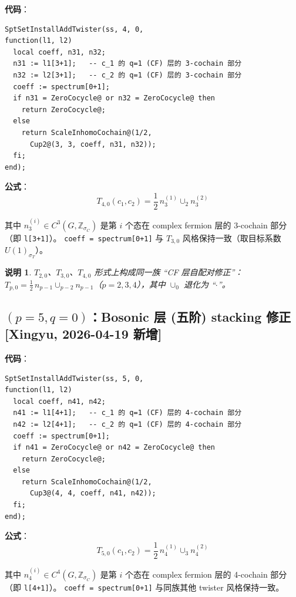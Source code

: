 \documentclass[a4paper,fontset=ubuntu,12pt]{ctexart}
\newtheorem{remark}[definition]{说明}
\newcommand{\ZZ}{\mathbb{Z}}
\newcommand{\aT}{\sigma_T}
\newcommand{\aC}{\sigma_C}
\begin{document}
\textbf{代码}：
\begin{lstlisting}
SptSetInstallAddTwister(ss, 4, 0,
function(l1, l2)
  local coeff, n31, n32;
  n31 := l1[3+1];   -- c_1 的 q=1 (CF) 层的 3-cochain 部分
  n32 := l2[3+1];   -- c_2 的 q=1 (CF) 层的 3-cochain 部分
  coeff := spectrum[0+1];
  if n31 = ZeroCocycle@ or n32 = ZeroCocycle@ then
    return ZeroCocycle@;
  else
    return ScaleInhomoCochain@(1/2,
      Cup2@(3, 3, coeff, n31, n32));
  fi;
end);
\end{lstlisting}

\textbf{公式}：
\begin{equation}
\label{eq:twister-40}
\boxed{T_{4,0}(c_1, c_2) = \frac{1}{2}\, n_3^{(1)} \cup_2 n_3^{(2)}}
\end{equation}

其中 $n_3^{(i)} \in C^3(G, \ZZ_{\aC})$ 是第 $i$ 个态在 complex fermion 层的 3-cochain 部分（即 \texttt{l[3+1]}）。
\texttt{coeff = spectrum[0+1]} 与 $T_{3,0}$ 风格保持一致（取目标系数 $U(1)_{\aT}$）。

\begin{remark}
$T_{2,0}$、$T_{3,0}$、$T_{4,0}$ 形式上构成同一族 ``CF 层自配对修正''：
$T_{p,0} = \frac{1}{2}\, n_{p-1} \cup_{p-2} n_{p-1}$（$p = 2, 3, 4$），其中 $\cup_0$ 退化为 ``$\cdot$''。
\end{remark}

\subsection{$(p = 5, q = 0)$：Bosonic 层 (五阶) stacking 修正 \textmd{[Xingyu, 2026-04-19 新增]}}
\label{sec:twister-50}

\textbf{代码}：
\begin{lstlisting}
SptSetInstallAddTwister(ss, 5, 0,
function(l1, l2)
  local coeff, n41, n42;
  n41 := l1[4+1];   -- c_1 的 q=1 (CF) 层的 4-cochain 部分
  n42 := l2[4+1];   -- c_2 的 q=1 (CF) 层的 4-cochain 部分
  coeff := spectrum[0+1];
  if n41 = ZeroCocycle@ or n42 = ZeroCocycle@ then
    return ZeroCocycle@;
  else
    return ScaleInhomoCochain@(1/2,
      Cup3@(4, 4, coeff, n41, n42));
  fi;
end);
\end{lstlisting}

\textbf{公式}：
\begin{equation}
\label{eq:twister-50}
\boxed{T_{5,0}(c_1, c_2) = \frac{1}{2}\, n_4^{(1)} \cup_3 n_4^{(2)}}
\end{equation}

其中 $n_4^{(i)} \in C^4(G, \ZZ_{\aC})$ 是第 $i$ 个态在 complex fermion 层的 4-cochain 部分（即 \texttt{l[4+1]}）。
\texttt{coeff = spectrum[0+1]} 与同族其他 twister 风格保持一致。
\end{document}
